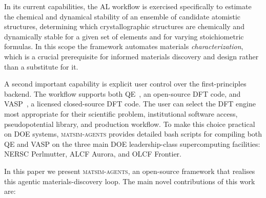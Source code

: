 \documentclass[conference]{IEEEtran}
\def\ac#1{#1}%
\def\acs#1{#1}%
\begin{document}
In its current capabilities, the \acs{AL} workflow is exercised
specifically to estimate the chemical and dynamical stability of an ensemble of
candidate atomistic structures, determining which crystallographic structures
are chemically and dynamically stable for a given set of elements and for varying
stoichiometric formulas. In this scope the framework automates materials
\emph{characterization}, which is a crucial prerequisite for informed materials
discovery and design rather than a substitute for it.

A second important capability is explicit user control over the first-principles
backend. The workflow supports both \ac{QE}~\cite{giannozzi2009qe,giannozzi2017qe}, an open-source \acs{DFT}
code, and \ac{VASP}~\cite{kresse1993vasp,kresse1996vasp}, a licensed closed-source \acs{DFT} code. The user can select the \acs{DFT}
engine most appropriate for their scientific problem, institutional software
access, pseudopotential library, and production workflow. To make this choice
practical on \acs{DOE} systems, \textsc{matsim-agents} provides detailed bash scripts
for compiling both \acs{QE} and \acs{VASP} on the three main \ac{DOE} leadership-class
supercomputing facilities: \ac{NERSC} Perlmutter, \ac{ALCF} Aurora, and \ac{OLCF} Frontier.

In this paper we present \textsc{matsim-agents}, an open-source framework that
realises this agentic materials-discovery loop. The main novel contributions of
this work are:
\end{document}
